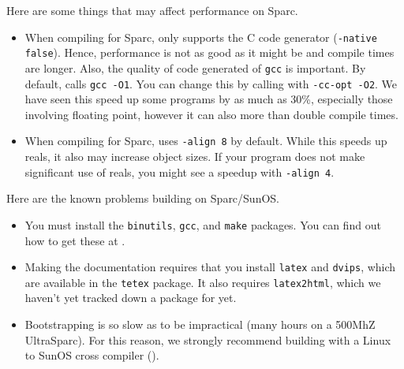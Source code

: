 
Here are some things that may affect performance on Sparc.
\begin{itemize}

\item
When compiling for Sparc, {\mlton} only supports the C code generator
({\tt -native false}).  Hence, performance is not as good as it might
be and compile times are longer.  Also, the quality of code generated
of {\tt gcc} is important.  By default, {\mlton} calls {\tt gcc -O1}.
You can change this by calling {\mlton} with {\tt -cc-opt -O2}.  We
have seen this speed up some programs by as much as 30\%, especially
those involving floating point, however it can also more than double
compile times.

\item
When compiling for Sparc, {\mlton} uses {\tt -align 8} by default.
While this speeds up reals, it also may increase object sizes.  If
your program does not make significant use of reals, you might see a
speedup with {\tt -align 4}.

\end{itemize}

Here are the known problems building {\mlton} on Sparc/SunOS.

\begin{itemize}

\item You must install the {\tt binutils}, {\tt gcc}, and {\tt make}
packages.  You can find out how to get these at
.

\item Making the documentation requires that you install {\tt latex}
and {\tt dvips}, which are available in the {\tt tetex} package.  It
also requires {\tt latex2html}, which we haven't yet tracked down a
package for yet.

\item Bootstrapping is so slow as to be impractical (many hours on a
500MhZ UltraSparc).  For this reason, we strongly recommend building
with a Linux to SunOS cross compiler ().

\end{itemize}
